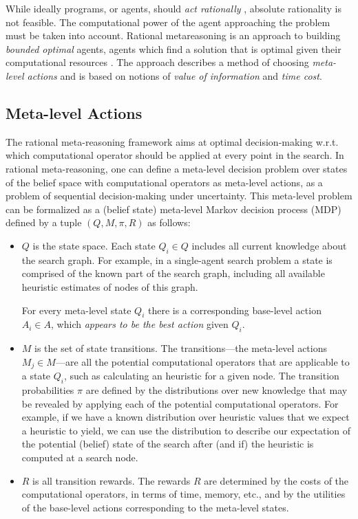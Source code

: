 While ideally programs, or agents, should {\em act rationally}
\cite{Russell.aima}, absolute rationality is not feasible. The
computational power of the agent approaching the problem must be taken
into account. Rational metareasoning \cite{Russell.right} is an
approach to building {\em bounded optimal} agents, agents which find a
solution that is optimal given their computational resources
\cite{Horvitz.reasoningabout}. The approach describes a method of
choosing {\em meta-level actions} and is based on notions of {\em
value of information} and {\em time cost}.

\subsection{Meta-level Actions}

The rational meta-reasoning framework aims at optimal
decision-making w.r.t. which computational operator should be applied
at every point in the search. In rational meta-reasoning, one can
define a meta-level decision problem over states of the belief space
with computational operators as meta-level actions, as a problem of
sequential decision-making under uncertainty. This meta-level problem
can be formalized as a (belief state) meta-level Markov decision
process (MDP) defined by a tuple $(Q, M, \pi, R)$ as follows:
\begin{itemize}
\item $Q$ is the state space. Each state $Q_i \in Q$ includes all
current knowledge about the search graph. For example, in a
single-agent search problem a state is comprised of the known part of
the search graph, including all available heuristic estimates of nodes
of this graph. 

For every meta-level state $Q_i$ there is a
corresponding base-level action $A_i \in A$, which \textit{appears to
be the best action} given $Q_i$. 

\item $M$ is the set of state transitions. The transitions---the
meta-level actions $M_j \in M$---are all the potential computational
operators that are applicable to a state $Q_i$, such as calculating an
heuristic for a given node. The transition probabilities $\pi$ are
defined by the distributions over new knowledge that may be revealed
by applying each of the potential computational operators.  For
example, if we have a known distribution over heuristic values that we
expect a heuristic to yield, we can use the distribution to describe
our expectation of the potential (belief) state of the search after
(and if) the heuristic is computed at a search node.

\item $R$ is all transition rewards. The rewards $R$ are determined by the 
costs of the computational operators, in terms of time, memory,
etc., and by the utilities of the base-level actions corresponding to
the meta-level states.  
\end{itemize}

